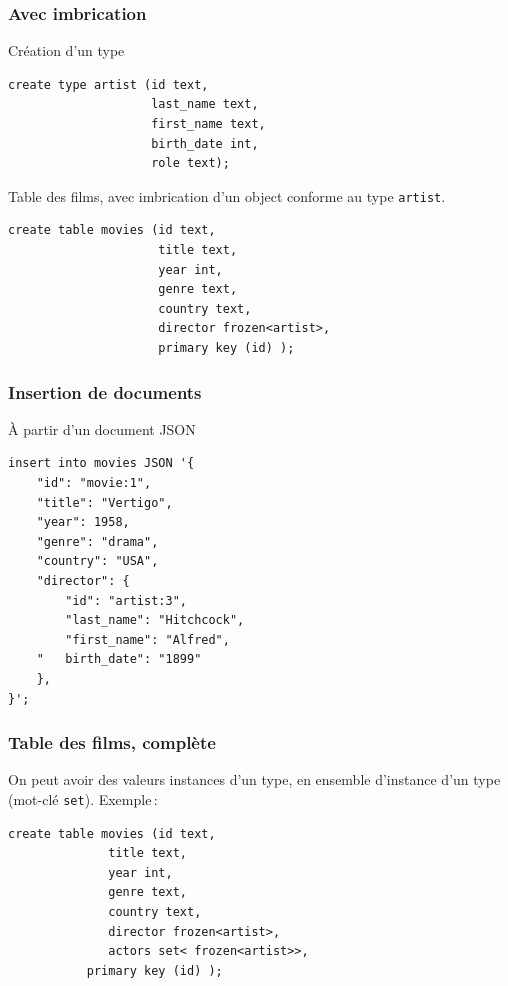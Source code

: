 \begin{frame}[fragile]
\frametitle{Avec imbrication}

Création d'un type
\begin{verbatim}
create type artist (id text,
                    last_name text,
                    first_name text,
                    birth_date int,
                    role text);\end{verbatim}

\vfill

Table des films, avec imbrication d'un object conforme au type \texttt{artist}.

\begin{verbatim}
create table movies (id text,
                     title text,
                     year int,
                     genre text,
                     country text,
                     director frozen<artist>,
                     primary key (id) );
\end{verbatim}
\end{frame}


\begin{frame}[fragile]
\frametitle{Insertion de documents}

À partir d'un document JSON

\begin{verbatim}
insert into movies JSON '{
    "id": "movie:1",
    "title": "Vertigo",
    "year": 1958,
    "genre": "drama",
    "country": "USA",
    "director": {
        "id": "artist:3",
        "last_name": "Hitchcock",
        "first_name": "Alfred",
    "   birth_date": "1899"
    },
}';
\end{verbatim}

\end{frame}


\begin{frame}[fragile]
\frametitle{Table des films, complète}

On peut avoir des valeurs instances d'un type, en \alert{ensemble} d'instance
d'un type (mot-clé \texttt{set}). Exemple\,: 

\vfill

\begin{verbatim}
create table movies (id text,
              title text,
              year int,
              genre text,
              country text,
              director frozen<artist>,
              actors set< frozen<artist>>,
           primary key (id) );
\end{verbatim}

\end{frame}



